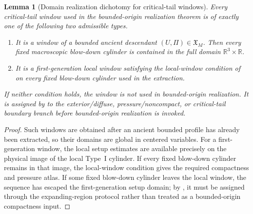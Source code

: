 \documentclass[11pt]{amsart}
\numberwithin{equation}{section}
\theoremstyle{plain}
\newtheorem{lemma}[lemma]{Lemma}
\theoremstyle{definition}
\theoremstyle{remark}
\begin{document}
\begin{lemma}[Domain realization dichotomy for critical-tail windows]
\label{lem:critical-tail-domain-realization-dichotomy}
Every critical-tail window used in the bounded-origin realization theorem is of
exactly one of the following two admissible types.
\begin{enumerate}[label=\textup{(\roman*)}]
   \item It is a window of a bounded ancient descendant
   \((U,\Pi)\in\mathfrak X_M\).  Then every fixed macroscopic blow-down cylinder
   is contained in the full domain \(\mathbb R^3\times\mathbb R\).
   \item It is a first-generation local window satisfying the local-window
   condition of  on every fixed
   blow-down cylinder used in the extraction.
\end{enumerate}
If neither condition holds, the window is not used in bounded-origin
realization.  It is assigned by
 to the exterior/diffuse,
pressure/noncompact, or critical-tail boundary branch before bounded-origin
realization is invoked.
\end{lemma}

\begin{proof}
Such windows are obtained after an ancient bounded profile has already
been extracted, so their domains are global in centered variables.  For a
first-generation window, the local setup estimates are available precisely on
the physical image of the local Type~I cylinder.  If every fixed blow-down
cylinder remains in that image, the local-window condition gives the required
compactness and pressure atlas.  If some fixed blow-down cylinder leaves the
local window, the sequence has escaped the first-generation setup domain; by
, it must be assigned through the
expanding-region protocol rather than treated as a bounded-origin compactness
input.
\end{proof}
\end{document}
